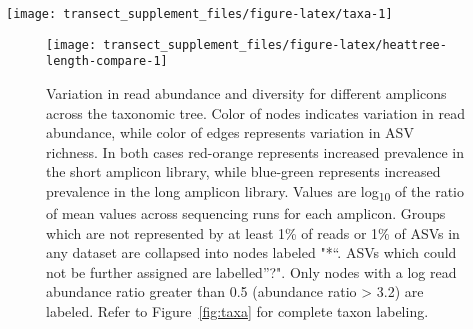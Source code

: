 \documentclass[
]{article}
\begin{document}
\begin{sidewaysfigure}

{\centering \texttt{[image: transect\_supplement\_files/figure-latex/taxa-1]} 

}

\caption[Heat tree summarizing taxonomic composition of soil community]{Heat tree summarizing taxonomic composition of soil community. Color and size of nodes represent the fractional ASV richness of that taxonomic group.
Color and thickness of branches represent the fractional read abundance of all ASVs belonging to that taxonomic group.
Diverse but relatively rare groups are thus shown as large, dark-colored nodes on relatively thin, light-colored branches (e.g., Dothideomycetes), while common but relatively non-diverse groups are shown as small, light-colored nodes on relatively thick, dark-colored branches (e.g., Russulales).
Groups which are not represented by at least 1\% of reads or 1\% of ASVs in any dataset are collapsed into nodes labeled "*``.
ASVs which could not be further assigned are labelled''?".
ASV richness and read abundance are displayed as the mean across sequencing runs.
Taxonomic assignment is by strict consensus of multiple ITS databases (Unite, Warcup) and assignment algorithms (RDPC, SINTAX, IDTAXA).
The RDP LSU database was not included, to ensure consistent assignment between long and short amplicon libraries.}\label{fig:taxa}
\end{sidewaysfigure}











\begin{figure}

{\centering \texttt{[image: transect\_supplement\_files/figure-latex/heattree-length-compare-1]} 

}

\caption[Variation in read abundance and diversity for different amplicons across the taxonomic tree]{Variation in read abundance and diversity for different amplicons across the taxonomic tree. Color of nodes indicates variation in read abundance, while color of edges represents variation in ASV richness.
In both cases red-orange represents increased prevalence in the short amplicon library, while blue-green represents increased prevalence in the long amplicon library.
Values are log\textsubscript{10} of the ratio of mean values across sequencing runs for each amplicon.
Groups which are not represented by at least 1\% of reads or 1\% of ASVs in any dataset are collapsed into nodes labeled "*``.
ASVs which could not be further assigned are labelled''?".
Only nodes with a log read abundance ratio greater than 0.5 (abundance ratio \textgreater{} 3.2) are labeled.
Refer to Figure~\ref{fig:taxa} for complete taxon labeling.}\label{fig:heattree-length-compare}
\end{figure}
\end{document}

